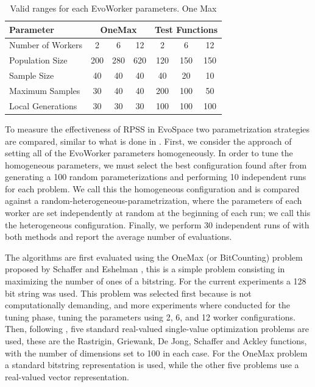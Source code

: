 \documentclass{llncs}
\begin{document}
\begin{table}[!t]
\caption{Valid ranges for each EvoWorker parameters. One Max}
\label{tab:params}
\centering
\begin{tabular}{|l|c|c|c|c|c|c| }
\hline
\textbf{Parameter} & \multicolumn{3}{|c|}{OneMax} & \multicolumn{3}{|c|}{Test Functions} \\
\hline
Number of Workers & 2 & 6 & 12 & 2 & 6 & 12\\
\hline
\hline
Population Size & 200 & 280 & 620 & 120 & 150 & 150\\
\hline
Sample Size & 40 & 40 & 40 & 40 & 20 & 10\\
\hline
Maximum Samples & 30 & 40 & 40 & 200 & 100 & 50\\
\hline
Local Generations & 30 & 30 & 30 & 100 & 100 & 100\\
\hline
\end{tabular}
\end{table}

To measure the effectiveness of RPSS in EvoSpace two parametrization strategies are compared, 
similar to what is done in \cite{fuku1,fuku2,garcia2014randomized}. First, we consider the approach of setting all 
of the EvoWorker parameters homogeneously. In order to tune the homogeneous parameters,
we must select the best configuration found after from generating a 100 random parameterizations 
and performing 10 independent runs for each problem. We call this the homogeneous configuration and 
is compared against a random-heterogeneous-parametrization, where the parameters of each worker are 
set independently at random at the beginning of each run; we call this the heterogeneous configuration.
Finally, we perform 30 independent runs of with both methods and report the average number of evaluations.

The algorithms are first evaluated using the OneMax (or BitCounting) problem proposed by 
Schaffer and Eshelman \cite{SE91}, this is a simple problem consisting in maximizing the number 
of ones of a bitstring. For the current experiments a 128 bit string was used. This problem was
selected first because is not computationally demanding, and more experiments where conducted for
the tuning phase, tuning the parameters using 2, 6, and 12 worker configurations. 
Then, following \cite{fuku1}, five standard real-valued single-value optimization problems 
are used, these are the Rastrigin, Griewank, De Jong, Schaffer  and Ackley functions, 
with the number of dimensions set to 100 in each case. For the OneMax problem a standard bitstring 
representation is used, while the other five problems use a real-valued vector representation.
\end{document}
